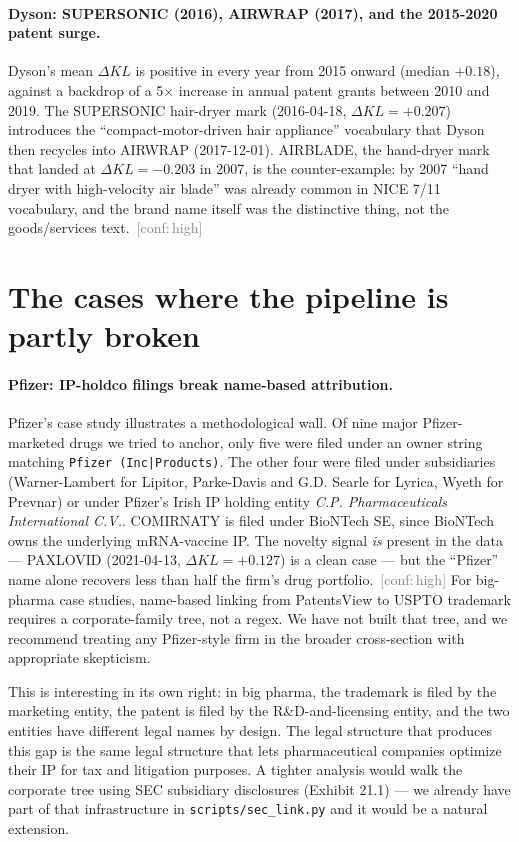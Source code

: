 \documentclass[11pt]{article}
\newcommand{\dKL}{\Delta KL}
\newcommand{\conf}[1]{\textcolor{gray}{\footnotesize\,[conf:\,#1]}}
\begin{document}
\paragraph{Dyson: SUPERSONIC (2016), AIRWRAP (2017), and the
2015-2020 patent surge.}
Dyson's mean $\dKL$ is positive in every year from 2015 onward
(median $+0.18$), against a backdrop of a 5$\times$ increase in
annual patent grants between 2010 and 2019. The SUPERSONIC hair-dryer
mark (2016-04-18, $\dKL = +0.207$) introduces the
``compact-motor-driven hair appliance'' vocabulary that Dyson then
recycles into AIRWRAP (2017-12-01). AIRBLADE, the hand-dryer mark
that landed at $\dKL = -0.203$ in 2007, is the counter-example: by
2007 ``hand dryer with high-velocity air blade'' was already common
in NICE 7/11 vocabulary, and the brand name itself was the
distinctive thing, not the goods/services text. \conf{high}

\section{The cases where the pipeline is partly broken}

\paragraph{Pfizer: IP-holdco filings break name-based attribution.}
Pfizer's case study illustrates a methodological wall. Of nine major
Pfizer-marketed drugs we tried to anchor, only five were filed under
an owner string matching \texttt{Pfizer (Inc|Products)}. The other
four were filed under subsidiaries (Warner-Lambert for Lipitor,
Parke-Davis and G.D. Searle for Lyrica, Wyeth for Prevnar) or under
Pfizer's Irish IP holding entity \emph{C.P. Pharmaceuticals
International C.V.}. COMIRNATY is filed under BioNTech SE, since
BioNTech owns the underlying mRNA-vaccine IP. The novelty signal
\emph{is} present in the data --- PAXLOVID (2021-04-13,
$\dKL = +0.127$) is a clean case --- but the ``Pfizer'' name alone
recovers less than half the firm's drug portfolio. \conf{high} For
big-pharma case studies, name-based linking from PatentsView to USPTO
trademark requires a corporate-family tree, not a regex. We have not
built that tree, and we recommend treating any Pfizer-style firm in
the broader cross-section with appropriate skepticism.

This is interesting in its own right: in big pharma, the trademark is
filed by the marketing entity, the patent is filed by the
R\&D-and-licensing entity, and the two entities have different legal
names by design. The legal structure that produces this gap is the
same legal structure that lets pharmaceutical companies optimize
their IP for tax and litigation purposes. A tighter analysis would
walk the corporate tree using SEC subsidiary disclosures (Exhibit
21.1) --- we already have part of that infrastructure in
\texttt{scripts/sec\_link.py} and it would be a natural extension.
\end{document}
